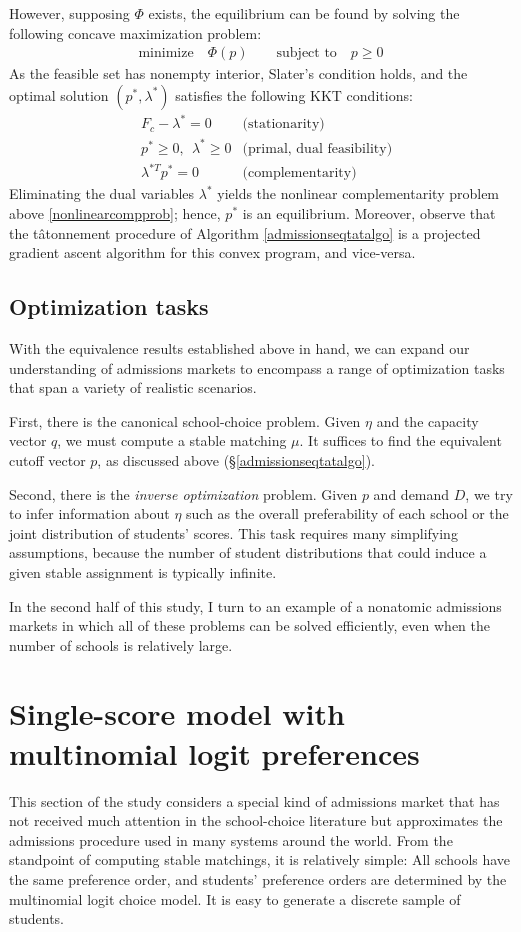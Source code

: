 \documentclass[12pt]{article}
\theoremstyle{definition}
\begin{document}
However, supposing $\Phi$ exists, the equilibrium can be found by solving the following concave maximization problem:
\begin{align*}
\text{minimize} \quad \Phi(p) \qquad \text{subject to} \quad  p \geq 0 
\end{align*}
As the feasible set has nonempty interior, Slater's condition holds, and the optimal solution $(p^*, \lambda^*)$ satisfies the following KKT conditions:
\begin{align*}
&F_c - \lambda^* = 0 & \text{(stationarity)}\\
&p^* \geq 0, ~~ \lambda^* \geq 0  & \text{(primal, dual feasibility)}\\
&\lambda^{*T} p^*=0  & \text{(complementarity)}
\end{align*}
Eliminating the dual variables $\lambda^*$ yields the nonlinear complementarity problem above \eqref{nonlinearcompprob}; hence, $p^*$ is an equilibrium. Moreover, observe that the t\^{a}tonnement procedure of Algorithm \ref{admissionseqtatalgo} is a projected gradient ascent algorithm for this convex program, and vice-versa. 

\subsection{Optimization tasks}
With the equivalence results established above in hand, we can expand our understanding of admissions markets to encompass a range of optimization tasks that span a variety of realistic scenarios.

First, there is the canonical school-choice problem. Given  $\eta$ and the capacity vector $q$, we must compute a stable matching $\mu$. It suffices to find the equivalent cutoff vector $p$, as discussed above (\S\ref{admissionseqtatalgo}).

Second, there is the \emph{inverse optimization} problem. Given $p$ and demand $D$, we try to infer information about $\eta$ such as the overall preferability of each school or the joint distribution of students' scores. This task requires many simplifying assumptions, because the number of student distributions that could induce a given stable assignment is typically infinite. 

In the second half of this study, I turn to an example of a nonatomic admissions markets in which all of these problems can be solved efficiently, even when the number of schools is relatively large. 

\section{Single-score model with multinomial logit preferences} \label{modeldescription}
This section of the study considers a special kind of admissions market that has not received much attention in the school-choice literature but approximates the admissions procedure used in many systems around the world. From the standpoint of computing stable matchings, it is relatively simple: All schools have the same preference order, and students' preference orders are determined by the multinomial logit choice model. It is easy to generate a discrete sample of students.
\end{document}
